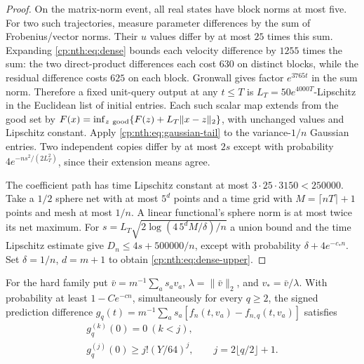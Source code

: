 \begin{proof}
On the matrix-norm event, all real states have block norms at most five.
For two such trajectories, measure parameter differences by the sum of
Frobenius/vector norms. Their \(u\) values differ by at most \(25\)
times this sum. Expanding \eqref{cp:nth:eq:dense} bounds
each velocity difference by \(1255\) times the sum: the two
direct-product differences each cost \(630\) on distinct blocks, while
the residual difference costs \(625\) on each block. Gronwall gives
factor \(e^{3765t}\) in the sum norm. Therefore a fixed unit-query
output at any \(t\le T\) is \(L_T=50e^{4000T}\)-Lipschitz in the
Euclidean list of initial entries. Each such scalar map extends from the
good set by
\(F(x)=\inf_{z\ {\rm good}}\{F(z)+L_T\|x-z\|_2\}\),
with unchanged values and Lipschitz constant. Apply
\eqref{cp:nth:eq:gaussian-tail} to the variance-\(1/n\)
Gaussian entries. Two independent copies differ by at most \(2s\) except
with probability \(4e^{-ns^2/(2L_T^2)}\), since their extension means
agree.

The coefficient path has time Lipschitz constant at most
\(3\cdot25\cdot3150<250000\). Take a \(1/2\) sphere net with at most
\(5^d\) points and a time grid with \(M=\lceil nT\rceil+1\) points and
mesh at most \(1/n\). A linear functional's sphere norm is at most twice
its net maximum. For \(s=L_T\sqrt{2\log(4\,5^dM/\delta)/n}\) a union
bound and the time Lipschitz estimate give \(D_n\le4s+500000/n\), except
with probability \(\delta+4e^{-c_*n}\). Set \(\delta=1/n\), \(d=m+1\) to
obtain \eqref{cp:nth:eq:dense-upper}.
\end{proof}

\begin{lemma}\label{cp:nth:omitted-derivative}

For the hard family put \(\bar v=m^{-1}\sum_a s_av_a\),
\(\lambda=\|\bar v\|_2\), and \(v_*=\bar v/\lambda\). With probability
at least \(1-Ce^{-cn}\), simultaneously for every \(q\ge2\), the signed
prediction difference
\(g_q(t)=m^{-1}\sum_a s_a[f_n(t,v_a)-f_{n,q}(t,v_a)]\)
satisfies
\begin{equation}\label{cp:nth:eq:omitted-jet}{\begin{gathered}
g_q^{(k)}(0)=0\ (k<j),\qquad\\
g_q^{(j)}(0)\ge j!(Y/64)^j,\qquad j=2\lfloor q/2\rfloor+1.
\end{gathered}}\end{equation}

\end{lemma}

